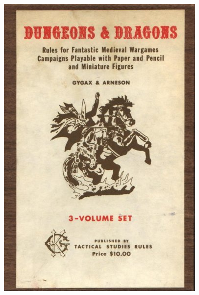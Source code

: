 \documentclass{beamer}\usepackage{graphicx, color}
\begin{document}
\begin{frame}
\begin{columns}
\begin{column}{0.5\textwidth}
      \includegraphics[width = \textwidth, keepaspectratio = true]{whitebox}
    \end{column}
  \end{columns}

\end{frame}
\end{document}
